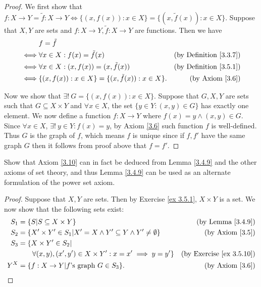 \begin{proof}
    We first show that \(f : X \to Y = \tilde{f} : X \to Y \iff \{(x, f(x)) : x \in X\} = \{(x, \tilde{f}(x)) : x \in X\}\).
    Suppose that \(X, Y\) are sets and \(f : X \to Y, \tilde{f} : X \to Y\) are functions.
    Then we have
    \begin{align*}
             & f = \tilde{f}                                                                                   \\
        \iff & \forall x \in X : f(x) = \tilde{f}(x)                      & \text{(by Definition \ref{3.3.7})} \\
        \iff & \forall x \in X : (x, f(x)) = (x, \tilde{f}(x))            & \text{(by Definition \ref{3.5.1})} \\
        \iff & \{(x, f(x)) : x \in X\} = \{(x, \tilde{f}(x)) : x \in X\}. & \text{(by Axiom \ref{3.6})}
    \end{align*}

    Now we show that \(\exists!\ G = \{(x, f(x)) : x \in X\}\).
    Suppose that \(G, X, Y\) are sets such that \(G \subseteq X \times Y\) and \(\forall x \in X\), the set \(\{y \in Y : (x, y) \in G\}\) has exactly one element.
    We now define a function \(f : X \to Y\) where \(f(x) = y \land (x, y) \in G\).
    Since \(\forall x \in X\), \(\exists!\ y \in Y : f(x) = y\), by Axiom \ref{3.6} such function \(f\) is well-defined.
    Thus \(G\) is the graph of \(f\), which means \(f\) is unique since if \(f, f'\) have the same graph \(G\) then it follows from proof above that \(f = f'\).
\end{proof}

\begin{exercise}\label{ex 3.5.11}
    Show that Axiom \ref{3.10} can in fact be deduced from Lemma \ref{3.4.9} and the other axioms of set theory, and thus Lemma \ref{3.4.9} can be used as an alternate formulation of the power set axiom.
\end{exercise}

\begin{proof}
    Suppose that \(X, Y\) are sets.
    Then by Exercise \ref{ex 3.5.1}, \(X \times Y\) is a set.
    We now show that the following sets exist:
    \begin{align*}
        S_1 & = \{S | S \subseteq X \times Y\}                                                 & \text{(by Lemma \ref{3.4.9})}        \\
        S_2 & = \{X' \times Y' \in S_1 | X' = X \land Y' \subseteq Y \land Y' \neq \emptyset\} & \text{(by Axiom \ref{3.5})}          \\
        S_3 & = \{X \times Y' \in S_2 |                                                                                               \\
            & \quad\quad \forall (x, y), (x', y') \in X \times Y' : x = x' \implies y = y'\}   & \text{(by Exercise \ref{ex 3.5.10})} \\
        Y^X & = \{f : X \to Y | f \text{'s graph } G \in S_3\}.                                & \text{(by Axiom \ref{3.6})}
    \end{align*}
\end{proof}

